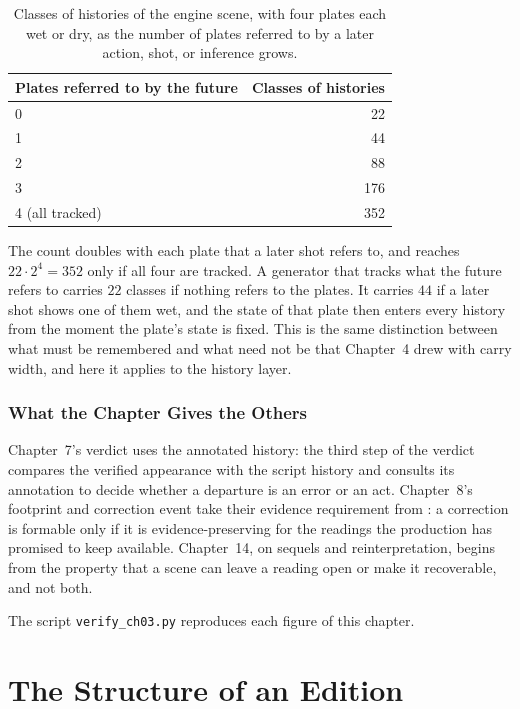\documentclass[11pt,twoside,openright]{book}
\theoremstyle{plain}
\theoremstyle{definition}
\theoremstyle{remark}
\begin{document}
\begin{table}[ht]
\centering
\begin{tabular}{@{}lr@{}}
\toprule
Plates referred to by the future & Classes of histories\\
\midrule
0 & 22\\
1 & 44\\
2 & 88\\
3 & 176\\
4 (all tracked) & 352\\
\bottomrule
\end{tabular}
\caption{Classes of histories of the engine scene, with four plates each wet or dry, as the number of plates referred to by a later action, shot, or inference grows.}\label{tab:noise}
\end{table}

The count doubles with each plate that a later shot refers to, and reaches $22\cdot2^4=352$ only if all four are tracked. A generator that tracks what the future refers to carries $22$ classes if nothing refers to the plates. It carries $44$ if a later shot shows one of them wet, and the state of that plate then enters every history from the moment the plate's state is fixed. This is the same distinction between what must be remembered and what need not be that Chapter~4 drew with carry width, and here it applies to the history layer.

\section{What the Chapter Gives the Others}\label{sec:gives3}

Chapter~7's verdict uses the annotated history: the third step of the verdict compares the verified appearance with the script history and consults its annotation to decide whether a departure is an error or an act. Chapter~8's footprint and correction event take their evidence requirement from : a correction is formable only if it is evidence-preserving for the readings the production has promised to keep available. Chapter~14, on sequels and reinterpretation, begins from the property that a scene can leave a reading open or make it recoverable, and not both.

The script \texttt{verify\_ch03.py} reproduces each figure of this chapter.

\part{The Structure of an Edition}
\end{document}
